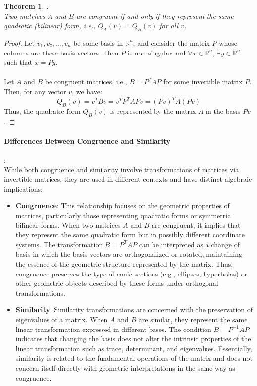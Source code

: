 \documentclass[11pt]{book} %
\newtheorem{theorem}{Theorem}[section]
\begin{document}
\begin{theorem}{:} \\
    Two matrices \( A \) and \( B \) are congruent if and only if they represent the same quadratic (bilinear) form, i.e., \( Q_A(v) = Q_B(v) \) for all \( v \).
\end{theorem}

\begin{proof} 
    Let $v_1, v_2, \ldots, v_n$ be some basis in $\mathbb{R}^n$, and consider the matrix $P$ whose columns are these basis vectors. 
    Then $P$ is non singular and $\forall x \in \mathbb{R}^n$, $\exists y \in \mathbb{R}^n$ such that $x = Py$. \\
    \\
    Let \( A \) and \( B \) be congruent matrices, i.e., \( B = P^T A P \) for some invertible matrix \( P \). 
    Then, for any vector \( v \), we have:
    \[
    Q_B(v) = v^T B v = v^T P^T A P v = (Pv)^T A (Pv) 
    \]
    Thus, the quadratic form \( Q_B(v) \) is represented by the matrix \( A \) in the basis \( Pv \). 
\end{proof}


\paragraph{Differences Between Congruence and Similarity}: \\

While both congruence and similarity involve transformations of matrices via invertible matrices, they are used in different contexts and have distinct algebraic implications:

\begin{itemize}
    \item \textbf{Congruence}: This relationship focuses on the geometric properties of matrices, 
    particularly those representing quadratic forms or symmetric bilinear forms. When two matrices \( A \) and \( B \) are congruent, 
    it implies that they represent the same quadratic form but in possibly different coordinate systems. 
    The transformation \( B = P^T A P \) can be interpreted as a change of basis in which the basis vectors are orthogonalized or rotated, 
    maintaining the essence of the geometric structure represented by the matrix. 
    Thus, congruence preserves the type of conic sections (e.g., ellipses, hyperbolas) or other geometric objects described by these forms under orthogonal transformations.

    \item \textbf{Similarity}: Similarity transformations are concerned with the preservation of eigenvalues of a matrix. 
    When \( A \) and \( B \) are similar, they represent the same linear transformation expressed in different bases. 
    The condition \( B = P^{-1} A P \) indicates that changing the basis does not alter the intrinsic properties of the linear transformation such as 
    trace, determinant, and eigenvalues. Essentially, similarity is related to the fundamental operations of the matrix and does not 
    concern itself directly with geometric interpretations in the same way as congruence. 

\end{itemize}
\end{document}
